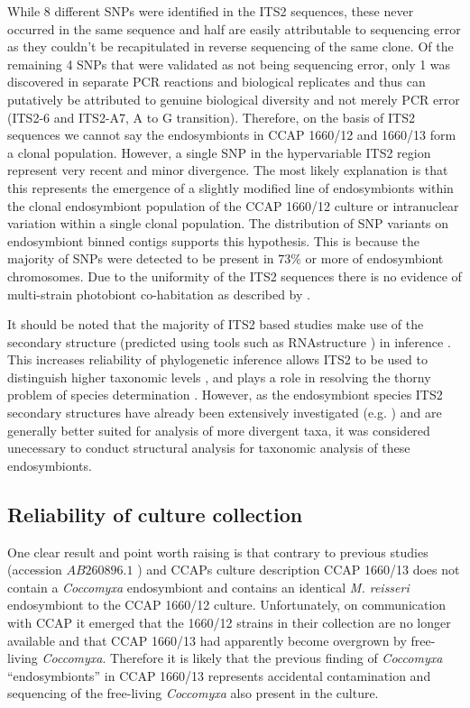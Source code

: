 While 8 different SNPs were identified in the ITS2 sequences, these never occurred in the same
sequence and half are easily attributable to sequencing error as they couldn't be recapitulated
in reverse sequencing of the same clone.  Of the remaining 4 SNPs that were validated
as not being sequencing error, only 1 was discovered in separate PCR reactions and biological replicates
and thus can putatively be attributed to genuine biological diversity and not merely PCR error
(ITS2-6 and ITS2-A7, A to G transition). Therefore, on the basis of ITS2 sequences
we cannot say the endosymbionts in CCAP 1660/12 and 1660/13 form a clonal population.
However, a single SNP in the hypervariable ITS2 region represent very recent and minor
divergence.  The most likely explanation is that this represents the emergence of a slightly modified
line of endosymbionts within the clonal endosymbiont population of the CCAP 1660/12 culture or intranuclear
variation within a single clonal population.  The distribution of SNP variants on endosymbiont binned
contigs supports this hypothesis. This is because the majority of SNPs were detected to be 
present in \(73\%\) or more of endosymbiont chromosomes. 
Due to the uniformity of the ITS2 sequences there is no evidence of multi-strain photobiont co-habitation as 
described by \citep{Hoshina2012}.

It should be noted that the majority of ITS2 based studies make use of the secondary structure (predicted
using tools such as RNAstructure \citep{Mathews2004}) in inference \citep{Schultz2009}. 
This increases reliability of phylogenetic inference \citep{Keller2008} allows ITS2 to be used
to distinguish higher taxonomic levels \citep{Coleman2003}, and plays a role
in resolving the thorny problem of species determination \citep{Muller2007}. 
However, as the endosymbiont species ITS2 secondary structures have already been extensively
investigated (e.g. \citep{Hoshina2008,Hoshina2010}) and are generally better suited
for analysis of more divergent taxa, it was considered 
unecessary to conduct structural analysis for taxonomic analysis of these
endosymbionts.

\subsection{Reliability of culture collection}

One clear result and point worth raising is that contrary to previous studies 
(accession \(AB260896.1\) \citep{Hoshina2008}) and CCAPs culture description 
CCAP 1660/13 does not contain a \textit{Coccomyxa} endosymbiont and contains 
an identical \textit{M. reisseri} endosymbiont to the CCAP 1660/12 culture. 
Unfortunately, on communication with CCAP it emerged that 
the 1660/12 strains in their collection are no longer available
and that CCAP 1660/13 had apparently become overgrown by free-living \textit{Coccomyxa}. 
Therefore it is likely that the previous finding of \textit{Coccomyxa} ``endosymbionts'' in
CCAP 1660/13 \citep{Hoshina2008} represents accidental contamination and sequencing 
of the free-living \textit{Coccomyxa} also present in the culture. 

